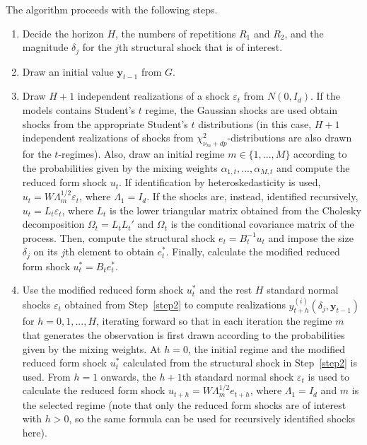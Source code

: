 \documentclass[nojss]{jss}
\begin{document}
\begin{appendix}
The algorithm proceeds with the following steps.
\begin{enumerate}\addtocounter{enumi}{-1}
\item Decide the horizon $H$, the numbers of repetitions $R_1$ and $R_2$, and the magnitude $\delta_j$ for the $j$th structural shock that is of interest.

\item Draw an initial value $\boldsymbol{y}_{t-1}$ from $G$.\label{step1}

\item Draw $H+1$ independent realizations of a shock $\varepsilon_t$ from $N(0,I_d)$. If the models contains Student's $t$ regime, the Gaussian shocks are used obtain shocks from the appropriate Student's $t$ distributions (in this case, $H+1$ independent realizations of shocks from $\chi^2_{\nu_m + dp}$-distributions are also drawn for the $t$-regimes). Also, draw an initial regime $m\in \lbrace 1,...,M \rbrace$ according to the probabilities given by the mixing weights $\alpha_{1,t},...,\alpha_{M,t}$ and compute the reduced form shock $u_t$. If identification by heteroskedasticity is used, $u_t=W\Lambda_m^{1/2}\varepsilon_t$, where $\Lambda_1=I_d$. If the shocks are, instead, identified recursively, $u_t=L_t\varepsilon_t$, where $L_t$ is the lower triangular matrix obtained from the Cholesky decomposition $\Omega_t = L_tL_t'$ and $\Omega_t$ is the conditional covariance matrix of the process. Then, compute the structural shock $e_t = B_t^{-1}u_t$ and impose the size $\delta_j$ on its $j$th element to obtain $e_t^*$. Finally, calculate the modified reduced form shock $u_t^*=B_te_t^*$.\label{step2}

\item Use the modified reduced form shock $u_t^*$ and the rest $H$ standard normal shocks $\varepsilon_t$ obtained from Step~\ref{step2} to compute realizations $y_{t+h}^{(i)}(\delta_j,\boldsymbol{y}_{t-1})$ for $h=0,1,...,H$, iterating forward so that in each iteration the regime $m$ that generates the observation is first drawn according to the probabilities given by the mixing weights. At $h=0$, the initial regime and the modified reduced form shock $u_t^*$ calculated from the structural shock in Step~\ref{step2} is used. From $h=1$ onwards, the $h+1$th standard normal shock $\varepsilon_t$ is used to calculate the reduced form shock $u_{t+h}=W\Lambda_m^{1/2}e_{t+h}$, where $\Lambda_1=I_d$ and $m$ is the selected regime (note that only the reduced form shocks are of interest with $h>0$, so the same formula can be used for recursively identified shocks here).


\end{enumerate}
\end{appendix}
\end{document}
